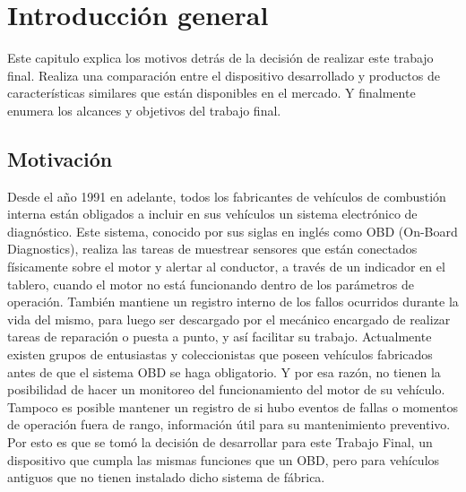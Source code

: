 
\chapter{Introducción general} %

Este capitulo explica los motivos detrás de la decisión de realizar este trabajo final. Realiza una comparación entre el dispositivo desarrollado y productos de características similares que están disponibles en el mercado. Y finalmente enumera los alcances y objetivos del trabajo final.

\label{Chapter1} %
\label{IntroGeneral}


\newcommand{\keyword}[1]{\textbf{#1}}
\newcommand{\tabhead}[1]{\textbf{#1}}
\newcommand{\code}[1]{\texttt{#1}}
\newcommand{\file}[1]{\texttt{\bfseries#1}}
\newcommand{\option}[1]{\texttt{\itshape#1}}
\newcommand{\grados}{$^{\circ}$}



\section{Motivación}

Desde el año 1991 en adelante, todos los fabricantes de vehículos de combustión interna están obligados a incluir en sus vehículos un sistema electrónico de diagnóstico. Este sistema, conocido por sus siglas en inglés como OBD (On-Board Diagnostics), realiza las tareas de muestrear sensores que están conectados físicamente sobre el motor y alertar al conductor, a través de un indicador en el tablero, cuando el motor no está funcionando dentro de los parámetros de operación. También mantiene un registro interno de los fallos ocurridos durante la vida del mismo, para luego ser descargado por el mecánico encargado de realizar tareas de reparación o puesta a punto, y así facilitar su trabajo.
Actualmente existen grupos de entusiastas y coleccionistas que poseen vehículos fabricados antes de que el sistema OBD se haga obligatorio. Y por esa razón, no tienen la posibilidad de hacer un monitoreo del funcionamiento del motor de su vehículo. Tampoco es posible mantener un registro de si hubo eventos de fallas o momentos de operación fuera de rango, información útil para su mantenimiento preventivo.
Por esto es que se tomó la decisión de desarrollar para este Trabajo Final, un dispositivo que cumpla las mismas funciones que un OBD, pero para vehículos antiguos que no tienen instalado dicho sistema de fábrica.

